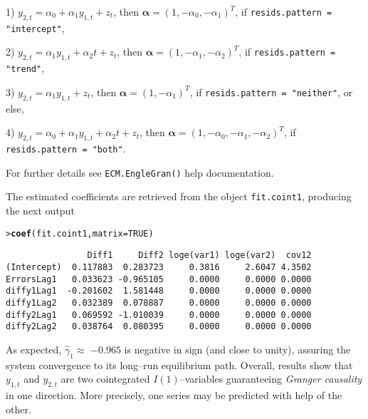 \documentclass[a4paper, 11pt]{article}\usepackage[]{graphicx}\usepackage[]{color}
\makeatletter
\newcommand{\hlnum}[1]{\textcolor[rgb]{0.686,0.059,0.569}{#1}}%
\newcommand{\hlstd}[1]{\textcolor[rgb]{0.345,0.345,0.345}{#1}}%
\newcommand{\hlkwc}[1]{\textcolor[rgb]{0.333,0.667,0.333}{#1}}%
\newcommand{\hlkwd}[1]{\textcolor[rgb]{0.737,0.353,0.396}{\textbf{#1}}}%
\newenvironment{kframe}{%
 \def\at@end@of@kframe{}%
 \ifinner\ifhmode%
  \def\at@end@of@kframe{\end{minipage}}%
  \begin{minipage}{\columnwidth}%
 \fi\fi%
 \def\FrameCommand##1{\hskip\@totalleftmargin \hskip-\fboxsep
 \colorbox{shadecolor}{##1}\hskip-\fboxsep
     \hskip-\linewidth \hskip-\@totalleftmargin \hskip\columnwidth}%
 \MakeFramed {\advance\hsize-\width
   \@totalleftmargin\z@ \linewidth\hsize
   \@setminipage}}%
 {\par\unskip\endMakeFramed%
 \at@end@of@kframe}
\newenvironment{knitrout}{}{} %
\makeatother
\begin{document}
\begin{enumerate}
1) $y_{2, t} = \alpha_0 + \alpha_1 y_{1, t} + z_t$, 
then $\boldsymbol{\alpha} = (1, -\alpha_0, -\alpha_1)^T$,
if {\color{blue} \texttt{resids.pattern = "intercept"}},

2) $y_{2, t} = \alpha_1 y_{1, t} + \alpha_2 t + z_t$, 
then $\boldsymbol{\alpha} = (1, -\alpha_1, -\alpha_2)^T$,
if {\color{blue} \texttt{resids.pattern = "trend"}},

3) $y_{2, t} = \alpha_1 y_{1, t} + z_t$, 
then $\boldsymbol{\alpha} = (1, -\alpha_1)^T$,
if {\color{blue} \texttt{resids.pattern = "neither"}}, or else,

4) $y_{2, t} = \alpha_0 + \alpha_1 y_{1, t} + \alpha_2 t + z_t$,
then $\boldsymbol{\alpha} = (1, -\alpha_0, -\alpha_1, -\alpha_2)^T$,
if {\color{blue} \texttt{resids.pattern = "both"}}.

For further details see {\color{blue} \texttt{ECM.EngleGran()}}
help documentation.
\end{enumerate}



The estimated coefficients are retrieved from the object
{\color{blue} \tt{fit.coint1}}, producing the next output
\begin{knitrout}\footnotesize
{}\color{fgcolor}\begin{kframe}
\begin{alltt}
\hlstd{> }\hlkwd{coef}\hlstd{(fit.coint1,} \hlkwc{matrix} \hlstd{=} \hlnum{TRUE}\hlstd{)}
\end{alltt}
\begin{verbatim}
                Diff1     Diff2 loge(var1) loge(var2)  cov12
(Intercept)  0.117883  0.283723     0.3816     2.6047 4.3502
ErrorsLag1   0.033623 -0.965105     0.0000     0.0000 0.0000
diffy1Lag1  -0.201602  1.581448     0.0000     0.0000 0.0000
diffy1Lag2   0.032389  0.078887     0.0000     0.0000 0.0000
diffy2Lag1   0.069592 -1.010039     0.0000     0.0000 0.0000
diffy2Lag2   0.038764  0.080395     0.0000     0.0000 0.0000
\end{verbatim}
\end{kframe}
\end{knitrout}





As expected, $\widehat{\gamma}_1 \approx $
\ensuremath{-0.965}
is negative in sign (and close to unity),
assuring the system convergence to its long--run
equilibrium path. Overall, results show that $y_{1, t}$ and 
$y_{2, t}$ are
two cointegrated $I(1)$--variables guaranteeing 
\textit{Granger causality} in one direction.
More precisely, one series may be predicted
with help of the other.
\end{document}
